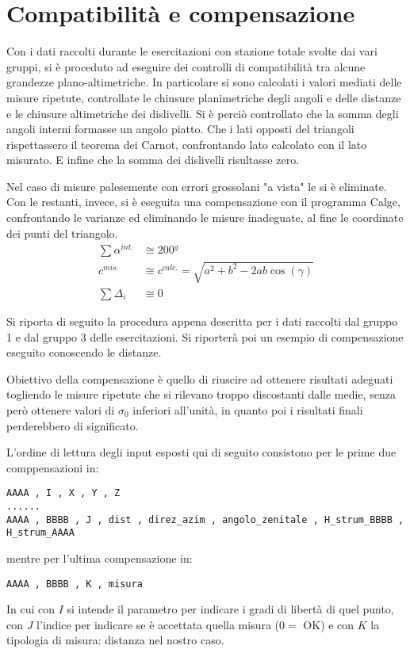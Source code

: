 \chapter{Compatibilità e compensazione}
Con i dati raccolti durante le esercitazioni con stazione totale svolte dai vari gruppi, si è proceduto ad eseguire dei controlli di compatibilità tra alcune grandezze plano-altimetriche.
In particolare si sono calcolati i valori mediati delle misure ripetute, controllate le chiusure planimetriche degli angoli e delle distanze e le chiusure altimetriche dei dislivelli.
Si è perciò controllato che la somma degli angoli interni formasse un angolo piatto. 
Che i lati opposti del triangoli rispettassero il teorema dei Carnot, confrontando lato calcolato con il lato misurato. 
E infine che la somma dei dislivelli risultasse zero.

Nel caso di misure palesemente con errori grossolani "a vista" le si è eliminate.
Con le restanti, invece, si è eseguita una compensazione con il programma Calge, confrontando le varianze ed eliminando le misure inadeguate, al fine le coordinate dei punti del triangolo. 
\begin{align}
	\sum \alpha^{int.} &\cong \si{200}{^g}\\
	c^{mis.} &\cong c^{calc.} = \sqrt{a^2 + b^2 - 2ab\cos(\gamma)} \\
	\sum \Delta_i &\cong 0
\end{align}

Si riporta di seguito la procedura appena descritta per i dati raccolti dal gruppo 1 e dal gruppo 3 delle esercitazioni. Si riporterà poi un esempio di compensazione eseguito conoscendo le distanze.

Obiettivo della compensazione è quello di riuscire ad ottenere risultati adeguati togliendo le misure ripetute che si rilevano troppo discostanti dalle medie, senza però ottenere valori di $\sigma_0$ inferiori all'unità, in quanto poi i risultati finali perderebbero di significato. 

L'ordine di lettura degli input esposti qui di seguito consistono per le prime due comppensazioni in:
\begin{lstlisting}
AAAA , I , X , Y , Z  
......
AAAA , BBBB , J , dist , direz_azim , angolo_zenitale , H_strum_BBBB , H_strum_AAAA
\end{lstlisting}
mentre per l'ultima compensazione in:
\begin{lstlisting}
AAAA , BBBB , K , misura
\end{lstlisting}
In cui con $I$ si intende il parametro per indicare i gradi di libertà di quel punto, con $J$ l'indice per indicare se è accettata quella misura ($0 = $ OK) e con $K$ la tipologia di misura: distanza nel nostro caso.
